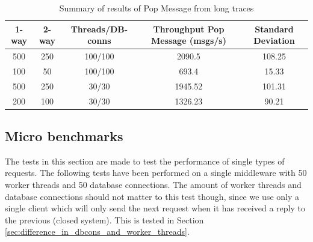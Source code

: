 \documentclass{article}
\begin{document}
            \begin{table}[H]
                \caption{Summary of results of Pop Message from long traces}
                \label{table:long_trace_test_summary_popmessage}
                    \begin{tabular}{|c|c|c|c|c|}
                        \hline 
                        \textbf{1-way} & \textbf{2-way} & \textbf{Threads/DB-conns} & \textbf{Throughput Pop Message (msgs/s)} & \textbf{Standard Deviation} \\ 
                        \hline 
                        500 & 250 & 100/100 &2090.5 &108.25\\
                        \hline
                        100 & 50 & 100/100 &693.4 &15.33\\
                        \hline 
                        500 & 250 & 30/30 &1945.52 &101.31\\
                        \hline
                        200 & 100 & 30/30 &1326.23 &90.21\\
                        \hline
                    \end{tabular} 
            \end{table}

        \subsection{Micro benchmarks}
            The tests in this section are made to test the performance of single types of requests. The following tests have been performed on a single middleware with 50 worker threads and 50 database connections. The amount of worker threads and database connections should not matter to this test though, since we use only a single client which will only send the next request when it has received a reply to the previous (closed system). This is tested in Section \ref{sec:difference_in_dbcons_and_worker_threads}.
\end{document}

